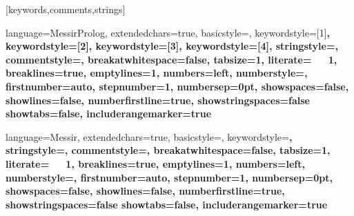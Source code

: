 \newcommand\addalphanumberedsinglerow[2]{
\stepcounter{itemtable}
\text{#1 \alph{itemtable}} & #2 \\
}


\newcommand\addalphanumbereddoublerow[3]{
\stepcounter{itemtable}
\text{#1 \alph{itemtable}} & \textbf{#2} \\
       & #3 \\
}


[keywords,comments,strings]%
 
 { 
language=MessirProlog,
extendedchars=true,
basicstyle=\ttfamily,
keywordstyle=[1]\color{blue}\bfseries,
keywordstyle=[2]\color{red},
keywordstyle=[3]\color{msrcolor12}\bfseries,
keywordstyle=[4]\color{msrcolor09}\bfseries,
stringstyle=\color{msrtextcl},
commentstyle=\color{msrcmtcl},
breakatwhitespace=false,
tabsize=1,
literate={\ \ }{{\ }}1,
breaklines=true,
emptylines=1,
numbers=left,
numberstyle=\tiny\color{blue}, 
firstnumber=auto,
stepnumber=1,
numbersep=0pt, 
showspaces=false,
showlines=false,
numberfirstline=true,
showstringspaces=false
showtabs=false,
includerangemarker=true
}



 { 
language=Messir,
extendedchars=true,
basicstyle=\ttfamily,
keywordstyle=\color{msrkeycl}\bfseries,
stringstyle=\color{msrtextcl},
commentstyle=\color{msrcmtcl},
breakatwhitespace=false,
tabsize=1,
literate={\ \ }{{\ }}1,
breaklines=true,
emptylines=1,
numbers=left,
numberstyle=\tiny\color{blue}, 
firstnumber=auto,
stepnumber=1,
numbersep=0pt, 
showspaces=false,
showlines=false,
numberfirstline=true,
showstringspaces=false
showtabs=false,
includerangemarker=true
}

